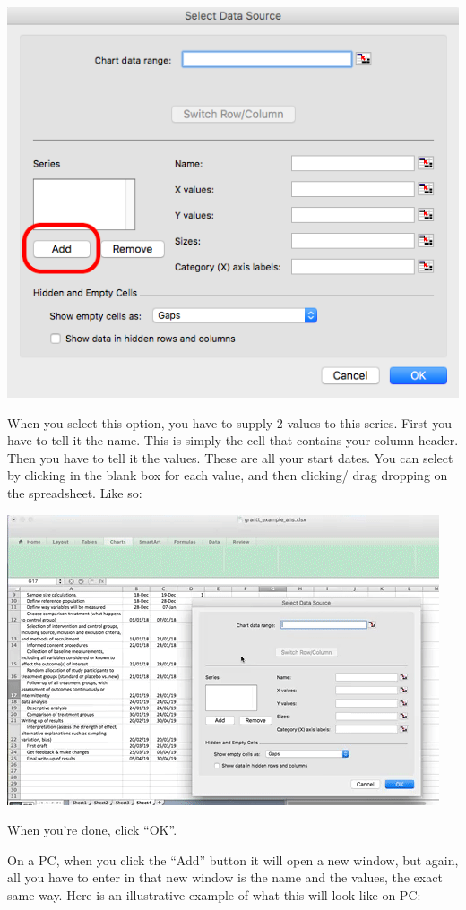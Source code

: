 \documentclass[]{book}
\theoremstyle{definition}
\theoremstyle{definition}
\theoremstyle{definition}
\theoremstyle{remark}
\begin{document}
\includegraphics{imgs/mac_add_data.png}

When you select this option, you have to supply 2 values to this series.
First you have to tell it the name. This is simply the cell that
contains your column header. Then you have to tell it the values. These
are all your start dates. You can select by clicking in the blank box
for each value, and then clicking/ drag dropping on the spreadsheet.
Like so:

\includegraphics{imgs/gantt_select_data_1.gif}

When you're done, click ``OK''.

On a PC, when you click the ``Add'' button it will open a new window,
but again, all you have to enter in that new window is the name and the
values, the exact same way. Here is an illustrative example of what this
will look like on PC:
\end{document}
